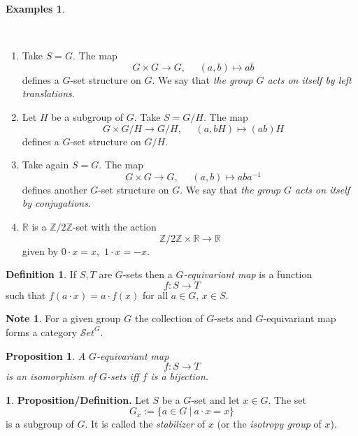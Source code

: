 \documentclass[12pt, letterpaper, oneside]{article}
\theoremstyle{plain}
\newtheorem{proposition}[theorem]{Proposition}
\theoremstyle{definition}
\newtheorem{definition}[theorem]{Definition}
\newtheorem{examples}[theorem]{Examples}
\newtheorem{note}[theorem]{Note}
\newtheorem{nn}[theorem]{}
\newcommand{\Z}{{\mathbb Z}}
\newcommand{\R}{{\mathbb R}}
\newcommand{\Set}{{\mathcal Set}}
\newcommand{\benu}{\begin{enumerate}}
\newcommand{\eenu}{\end{enumerate}}
\newcommand{\vs}{\vskip 5mm}
\newcommand{\isep}[1][0]{\setlength{\itemsep}{#1 mm}}
\begin{document}
\begin{examples}\ 

\vskip -13mm

\ 
\benu
\isep[5]
\item Take $S = G$. The map 
$$\ \ \ G \times G \to G, \ \ \ \ \ \ (a, b) \mapsto ab$$
defines a  $G$-set structure on $G$. We say that \emph{the group $G$ acts on
itself by left translations}. 


\item Let $H$ be a subgroup of $G$. Take $S = G/H$. The map 
$$\ \ \ G \times G/H \to G/H, \ \ \ \ \ \ (a, bH) \mapsto (ab)H$$
defines a $G$-set structure on $G/H$.

\item Take again $S = G$. The map  
$$\ \ \ G \times G \to G, \ \ \ \ \ \ (a, b) \mapsto aba^{-1}$$
defines another  $G$-set structure on $G$.  We say that \emph{the group $G$ acts on
itself by conjugations}.

\item $\R$ is a  $\Z/2\Z$-set with the action 
$$\Z/2\Z \times \R \to \R$$
given by $0\cdot x = x$,\ $1\cdot x = -x$. 

\eenu

\end{examples}

\vs

\begin{definition} 
If $S, T$ are $G$-sets then a \emph{$G$-equivariant map} is a function
$$f\colon S \to T$$
such that $f(a\cdot x) = a\cdot f(x)$ for all $a\in G$, $x\in S$.
\end{definition}

\vs

\begin{note}
For a given group $G$ the collection of $G$-sets and $G$-equivariant map forms 
a category $\Set^{G}$.
\end{note}

\vs\vs

\begin{proposition}
A $G$-equivariant map 
$$f\colon S \to T$$
is an isomorphism of $G$-sets iff $f$ is a bijection. 
\end{proposition}

\vs\vs

\begin{nn}\textbf{Proposition/Definition.}
Let $S$ be a $G$-set and let $x\in G$. The set
$$G_{x} := \{ a\in G \ | \  a\cdot x = x \}$$
is a subgroup of $G$. It is called the \emph{stabilizer} of $x$ (or the 
\emph{isotropy group} of $x$). 
\end{nn}
\end{document}
